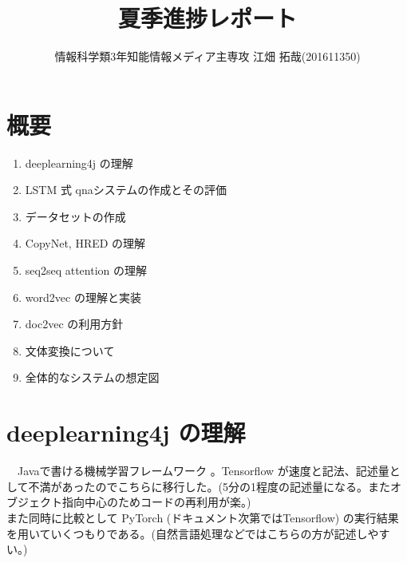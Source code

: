 \documentclass{scrartcl}
\author{情報科学類3年知能情報メディア主専攻 江畑 拓哉(201611350)}
\date{}
\title{夏季進捗レポート}
\begin{document}
\maketitle
\section{概要}
\label{sec:org8318126}
\begin{enumerate}
\item deeplearning4j の理解\\
\item LSTM 式 qnaシステムの作成とその評価\\
\item データセットの作成\\
\item CopyNet, HRED の理解\\
\item seq2seq attention の理解\\
\item word2vec の理解と実装\\
\item doc2vec の利用方針\\
\item 文体変換について\\
\item 全体的なシステムの想定図\\
\end{enumerate}
\section{deeplearning4j の理解}
\label{sec:orgebe9aa7}
　Javaで書ける機械学習フレームワーク \cite{deeplearning4j} 。Tensorflow が速度と記法、記述量として不満があったのでこちらに移行した。(5分の1程度の記述量になる。またオブジェクト指向中心のためコードの再利用が楽。)\\
  また同時に比較として PyTorch (ドキュメント次第ではTensorflow) の実行結果を用いていくつもりである。(自然言語処理などではこちらの方が記述しやすい。)\\
\end{document}
